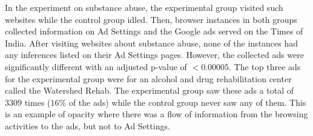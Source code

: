 \documentclass[10pt, onecolumn]{report}
\begin{document}
In the experiment on substance abuse, the experimental group visited such websites 
while the control group idled.  Then, browser instances in both groups collected 
information on Ad Settings and the Google ads served on the Times of India.
After visiting websites about substance abuse, none of the 
instances had any inferences listed on their Ad Settings pages. 
However, the collected ads were significantly different with an adjusted 
p-value of $< 0.00005$. The top three ads for the experimental group were for
an alcohol and drug rehabilitation center called the Watershed Rehab. 
The experimental group saw these ads a total of $3309$ times ($16\%$ of the ads)
while the control group never saw any of them.
This is an example of opacity where there was a flow of 
information from the browsing activities to the ads, but not to Ad Settings.


\end{document}
